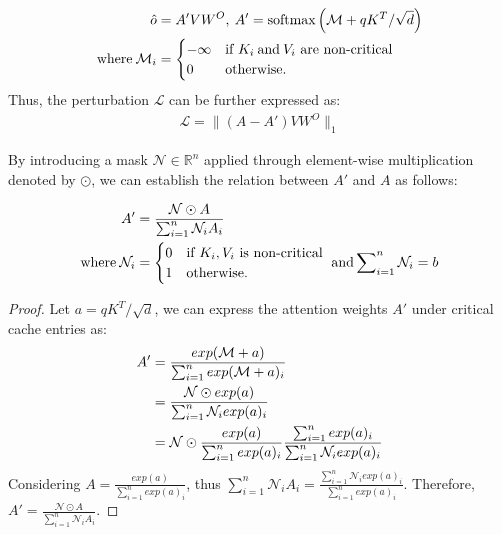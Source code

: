 {
\small
	\begin{align}
        \hat{o} &= A' V W^O, \: A' = \text{softmax}\left(\mathcal{M}+qK^T/\sqrt{d} \right) \\
        \text{where} \: \mathcal{M}_{i} &=
        \begin{cases}
            -\infty 		&  \text{if  $K_i \: \text{and} \: V_i$ {are non-critical} }\\
            0 &\text{otherwise.}\\
        \end{cases} \notag
    \end{align}
}
Thus, the perturbation $\mathcal{L}$ can be further expressed as:
{\small
\begin{align}
	\mathcal{L} = \lVert (A-A')VW^O\rVert_1
\end{align}}
\begin{comment}
\end{comment}
\begin{theorem}
	\label{thm:mask_rewrite}
	By introducing a mask $\mathcal{N}\in \mathbb{R}^{n}$ applied through element-wise multiplication denoted by $\odot$,  we can establish the relation between $A'$ and $A$ as follows:
	
	 {\small
 	\begin{align}
        A' &= \frac{\mathcal{N} \odot A}{\sum_{i=1}^{n} \mathcal{N}_i A_i} \quad \\
        \text{where} \: \mathcal{N}_{i}  &=
		\begin{cases}
			0 		&  \text{if  $K_i , V_i$ {is non-critical} } \\
			1 &\text{otherwise.}\\
		\end{cases} \notag
		\text{and} \sum\nolimits_{i=1}^{n} \mathcal{N}_i = b
\end{align}}
\end{theorem}
\begin{proof}
Let $a = qK^T/\sqrt{d}$, we can express the attention weights $A'$ under critical cache entries as:
{
\small
\begin{align}
    A' &= \frac{exp(\mathcal{M}+ a)}{ \sum_{i=1}^{n} exp(\mathcal{M}+ a)_i} \\
       &= \frac{\mathcal{N} \odot exp(a)}{\sum_{i=1}^{n} \mathcal{N}_i  exp(a)_i } \notag \\
       &= \mathcal{N} \odot \frac{ exp(a)}{\sum_{i=1}^{n} exp(a)_i} \frac{\sum_{i=1}^{n} exp(a)_i}{\sum_{i=1}^{n} \mathcal{N}_i  exp(a)_i } \notag
\end{align}
}
	Considering $A = \frac{exp(a)}{\sum_{i=1}^{n} exp(a)_i}$, thus $\sum_{i=1}^{n} \mathcal{N}_i A_i = \frac{\sum_{i=1}^{n} \mathcal{N}_i exp(a)_i}{\sum_{i=1}^{n} exp(a)_i}$. Therefore, $A' = \frac{\mathcal{N} \odot A}{\sum_{i=1}^{n} \mathcal{N}_i A_i}$.
\end{proof}
